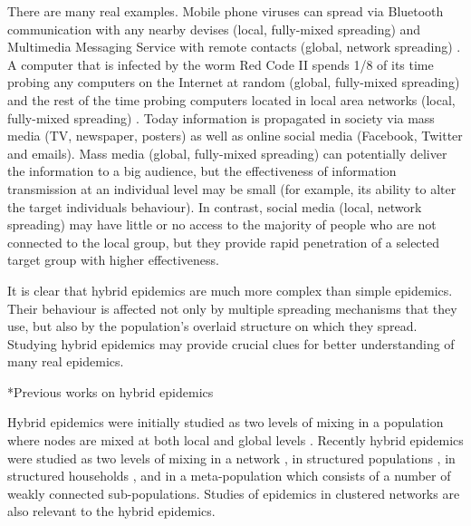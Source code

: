 \documentclass[9pt]{article}
\makeatletter
\renewcommand{\subsection}{\@startsection {subsection}{2}{0pt}{-6pt}{1pt}{\reset@font \normalsize \bfseries}}
\makeatother
\begin{document}
There are many real examples. Mobile phone viruses can spread via Bluetooth communication with any nearby devises (local, fully-mixed spreading) and Multimedia Messaging Service with remote contacts (global, network spreading) \cite{Wang_2009}.
A computer that is infected by the worm {Red Code II} spends 1/8 of its time probing any computers on the Internet at random (global, fully-mixed spreading) and the rest of the time probing computers located in local area networks (local, fully-mixed spreading) \cite{Moore_2002}. 
Today information is propagated in society
via mass media (TV, newspaper, posters) as well as online social media (Facebook, Twitter and emails).
Mass media (global, fully-mixed spreading) can potentially deliver
the information to a big audience, but the effectiveness
of information transmission at an individual level may be small
(for example, its ability to alter the target individuals behaviour).
In contrast, social media (local, network spreading)
may have little or no access to the majority of people who are
not connected to the local group, but they provide rapid penetration of a selected target group with higher effectiveness. 

It is clear that hybrid epidemics are much more complex than simple epidemics. Their behaviour is affected not only by multiple spreading mechanisms that they use, but also by the population's overlaid structure on which they spread. Studying hybrid epidemics may provide crucial clues for better understanding of many real epidemics.



\subsection*{Previous works on hybrid epidemics}

Hybrid epidemics were initially studied as two levels of mixing in a population where nodes are mixed at both local and global levels \cite{Ball_1997}. Recently hybrid epidemics were studied as two levels of mixing in a network \cite{Kiss_Green_Kao_2006, Ball_Neal_2008, Estrada_2011}, in structured populations \cite{Vazquez_2007}, in structured households \cite{House_Keeling_2008, Ball_2012, Ma_2013},  and in a meta-population which consists of a number of weakly connected sub-populations\cite{Watts_2005,Colizza_Vespignani_2007,Mata_2013,Min_2013, Keeling_2010, Apolloni_2014}. Studies of epidemics in clustered networks \cite{Miller_2009,Tildesley_2010,Volz_2011} are also relevant to the hybrid epidemics. 
\end{document}
